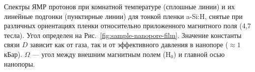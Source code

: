 Спектры ЯМР протонов при комнатной температуре (сплошные линии)
и их линейные подгонки (пунктирные линии)
для тонкой пленки a-Si:H,
снятые при различных ориентациях пленки относительно приложенного магнитного поля (4,7 тесла).
Угол определен на  Рис.~\ref{fig:sample-nanopore-film}.
Значение константы связи $D$ зависит как от газа,
так и от эффективного давления в нанопоре ($\approx 1$ кБар).
$\Omega$ --- угол между внешним магнитным полем (H$_0$) и главной осью нанопоры.
